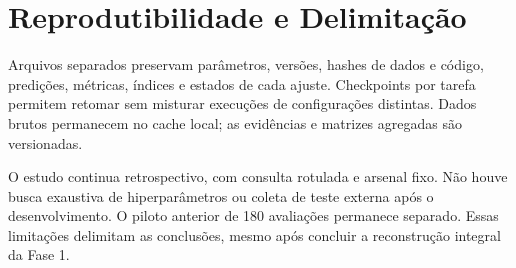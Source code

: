 \section{Reprodutibilidade e Delimitação}

Arquivos separados preservam parâmetros, versões, hashes de dados e código, predições, métricas, índices e estados de cada ajuste. Checkpoints por tarefa permitem retomar sem misturar execuções de configurações distintas. Dados brutos permanecem no cache local; as evidências e matrizes agregadas são versionadas.

O estudo continua retrospectivo, com consulta rotulada e arsenal fixo. Não houve busca exaustiva de hiperparâmetros ou coleta de teste externa após o desenvolvimento. O piloto anterior de 180 avaliações permanece separado. Essas limitações delimitam as conclusões, mesmo após concluir a reconstrução integral da Fase 1.
